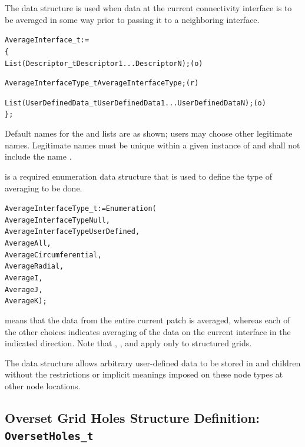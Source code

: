 The  data structure is used when data at the
current connectivity interface is to be averaged in some way prior to
passing it to a neighboring interface.

\begin{alltt}
  AverageInterface\_t :=
    \{
    List( Descriptor\_t Descriptor1 ... DescriptorN ) ;                      (o)

    AverageInterfaceType\_t AverageInterfaceType ;                           (r)

    List( UserDefinedData\_t UserDefinedData1 ... UserDefinedDataN ) ;       (o)
    \} ;
\end{alltt}

\begin{notes}
\item
 Default names for the  and
  lists are as shown; users may choose other
 legitimate names.
 Legitimate names must be unique within a given instance of
  and shall not include the name
 .
\end{notes}

 is a required enumeration data structure
that is used to define the type of averaging to be done.
\begin{alltt}
  AverageInterfaceType_t := Enumeration(
    AverageInterfaceTypeNull,
    AverageInterfaceTypeUserDefined,
    AverageAll,
    AverageCircumferential,
    AverageRadial,
    AverageI,
    AverageJ,
    AverageK ) ;
\end{alltt}

 means that the data from the entire current patch is
averaged, whereas each of the other choices indicates averaging of the
data on the current interface in the indicated direction.
Note that , , and 
apply only to structured grids.

The  data structure allows arbitrary
user-defined data to be stored in  and
 children without the restrictions or implicit
meanings imposed on these node types at other node locations.

\subsection{Overset Grid Holes Structure Definition: \texttt{OversetHoles\_t}}
\label{s:OversetHoles}

